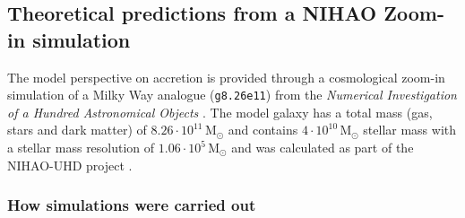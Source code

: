 \documentclass[fleqn,usenatbib]{mnras}
\begin{document}

\subsection{Theoretical predictions from a NIHAO Zoom-in simulation}\label{sec:sim_data}

The model perspective on accretion is provided through a cosmological zoom-in simulation of a Milky Way analogue (\texttt{g8.26e11}) from the \textit{Numerical Investigation of a Hundred Astronomical Objects} \citep[NIHAO,][]{Wang2015}. The model galaxy has a total mass (gas, stars and dark matter) of $8.26 \cdot 10^{11}\,\mathrm{M_\odot}$ and contains $4 \cdot 10^{10}\,\mathrm{M_\odot}$ stellar mass with a stellar mass resolution of $1.06 \cdot 10^{5}\,\mathrm{M_\odot}$ \citep{Buck2021} and was calculated as part of the NIHAO-UHD project \citep{Buck2020b}.

\subsubsection{How simulations were carried out}

\end{document}

